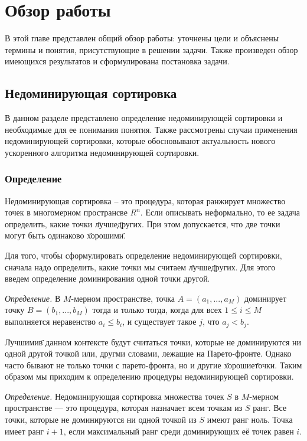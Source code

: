 
\chapter{Обзор работы}
\label{chapter1}

В этой главе представлен общий обзор работы: уточнены цели и объяснены термины и понятия, присутствующие в решении
задачи. Также произведен обзор имеющихся результатов и сформулирована постановка задачи.

\section{Недоминирующая сортировка}

В данном разделе представлено определение недоминирующей сортировки и необходимые для ее понимания понятия.
Также рассмотрены случаи применения недоминирующей сортировки, которые обосновывают актуальность нового ускоренного
алгоритма недоминирующей сортировки.

\subsection{Определение}

Недоминирующая сортировка -- это процедура, которая ранжирует множество точек в многомерном пространсве $R^n$.
Если описывать неформально, то ее задача определить, какие точки \"лучше\" других. При этом допускается, что две точки 
могут быть одинаково \"хорошими\".

Для того, чтобы сформулировать определение недоминирующей сортировки, сначала надо определить, какие точки мы считаем 
\"лучше\" других. Для этого введем определение доминирования одной точки другой.

\textit{Определение.} В $M$-мерном пространстве, точка $A = (a_1,...,a_M)$ доминирует точку $B = (b_1,...,b_M)$
 тогда и только тогда, когда для всех $1 \leq i \leq M$ выполняется неравенство $a_i\leq b_i$, и существует такое $j$,
 что $a_j < b_j$.

\"Лучшими\" в данном контексте будут считаться точки, которые не доминируются ни одной другой точкой или, другми словами, 
лежащие на Парето-фронте. Однако часто бывают не только точки с парето-фронта, но и другие \"хорошие\" точки. Таким
образом мы приходим к определению процедуры недоминирующей сортировки.

\textit{Определение.} Недоминирующая сортировка множества точек $S$ в $M$-мерном пространстве — это процедура, которая 
назначает всем точкам из $S$ ранг. Все точки, которые не доминируются ни одной точкой из $S$ имеют ранг ноль. Точка 
имеет ранг $i+1$, если максимальный ранг среди доминирующих её точек равен $i$.

